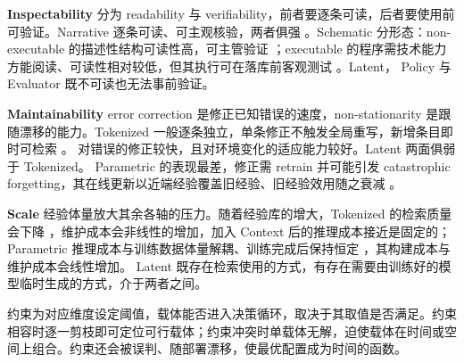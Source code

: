 \textbf{Inspectability} 分为 readability 与 verifiability，前者要逐条可读，后者要使用前可验证。Narrative 逐条可读、可主观核验，两者俱强 \cite{Zha23c}。Schematic 分形态：non-executable 的描述性结构可读性高，可主管验证 \cite{Ano24}；executable 的程序需技术能力方能阅读、可读性相对较低，但其执行可在落库前客观测试 \cite{Wan23c}。Latent， Policy 与 Evaluator 既不可读也无法事前验证。

\textbf{Maintainability} error correction 是修正已知错误的速度，non-stationarity 是跟随漂移的能力。Tokenized 一般逐条独立，单条修正不触发全局重写，新增条目即时可检索 \cite{Zha23c,Wan23c}。 对错误的修正较快，且对环境变化的适应能力较好。Latent 两面俱弱于 Tokenized。 Parametric 的表现最差，修正需 retrain 并可能引发 catastrophic forgetting，其在线更新以近端经验覆盖旧经验、旧经验效用随之衰减 \cite{Bai24}。


\textbf{Scale} 经验体量放大其余各轴的压力。随着经验库的增大，Tokenized 的检索质量会下降 \cite{Fu24}，维护成本会非线性的增加，加入 Context 后的推理成本接近是固定的；Parametric 推理成本与训练数据体量解耦、训练完成后保持恒定 \cite{Pan24}，其构建成本与维护成本会线性增加。 Latent 既存在检索使用的方式，有存在需要由训练好的模型临时生成的方式，介于两者之间。


约束为对应维度设定阈值，载体能否进入决策循环，取决于其取值是否满足。约束相容时逐一剪枝即可定位可行载体；约束冲突时单载体无解，迫使载体在时间或空间上组合。约束还会被误判、随部署漂移，使最优配置成为时间的函数。
